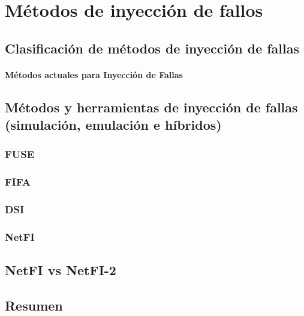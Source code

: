 \chapter{Métodos de inyección de fallos}

\section{Clasificación de métodos de inyección de fallas}
	\subsubsection{Métodos actuales para Inyección de Fallas}

\section{ Métodos y herramientas de inyección de fallas (simulación, emulación e híbridos)}
	\subsection{FUSE}
	\subsection{FIFA}
	\subsection{DSI}
	\subsection{NetFI}
	
\section{NetFI vs NetFI-2}

\section{Resumen}